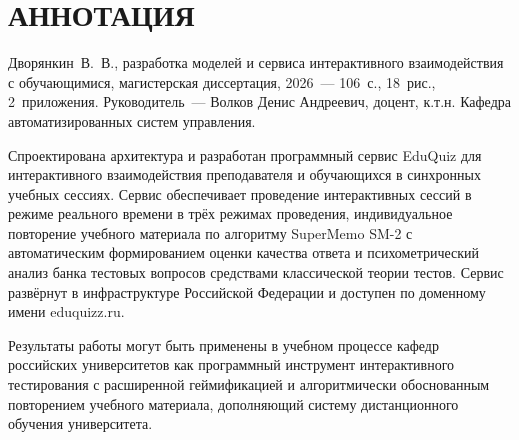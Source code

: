 \section*{АННОТАЦИЯ}
\thispagestyle{plain}

Дворянкин~В.~В., разработка моделей и сервиса интерактивного
взаимодействия с обучающимися, магистерская
диссертация, 2026~--- 106~с., 18~рис., 2~приложения. Руководитель~--- Волков
Денис Андреевич, доцент, к.т.н. Кафедра автоматизированных
систем управления.

Спроектирована архитектура и разработан программный сервис
EduQuiz для интерактивного взаимодействия преподавателя
и обучающихся в синхронных учебных сессиях. Сервис обеспечивает
проведение интерактивных сессий в режиме реального времени
в трёх режимах проведения, индивидуальное повторение учебного
материала по алгоритму SuperMemo SM-2 с автоматическим
формированием оценки качества ответа и психометрический анализ
банка тестовых вопросов средствами классической теории тестов.
Сервис развёрнут в инфраструктуре Российской Федерации
и доступен по доменному имени eduquizz.ru.

Результаты работы могут быть применены в учебном процессе кафедр
российских университетов как программный инструмент интерактивного
тестирования с расширенной геймификацией и алгоритмически
обоснованным повторением учебного материала, дополняющий систему
дистанционного обучения университета.

\newpage
